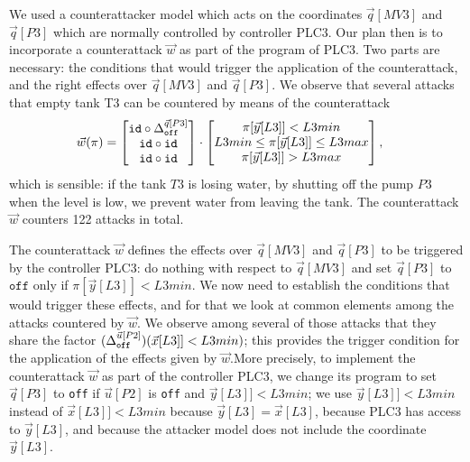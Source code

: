 {{We used a counterattacker model which acts on the coordinates $\vec{q}[MV3]$ and $\vec{q}[P3]$ which are normally controlled by controller PLC3. Our plan then is to incorporate a counterattack $\vec{w}$ as part of the program of PLC3. Two parts are necessary: the conditions that would trigger the application of the counterattack, and the right effects over $\vec{q}[MV3]$ and $\vec{q}[P3]$. We observe that several attacks that empty tank T3 can be countered by means of the counterattack 
\begin{align*}
    \vec{w}(\pi)&=
    \begin{bmatrix}
    {\texttt{id}}\circ {\Delta}^{\vec{q}[P3]}_{\texttt{off}} \\
     {\texttt{id}}\circ {\texttt{id}} \\
     {\texttt{id}}\circ {\texttt{id}} \\
    \end{bmatrix}
    \cdot
    \begin{bmatrix}
      \pi[\vec{y}[L3]]<L3min \\
      L3min \leq \pi[\vec{y}[L3]]\leq L3max \\
      \pi[\vec{y}[L3]]>L3max
    \end{bmatrix},
  \end{align*} 
which is sensible: if the tank $T3$ is losing water, by shutting off the pump $P3$ when the level is low, we prevent water from leaving the tank. The counterattack $\vec{w}$ counters 122 attacks in total.

The counterattack $\vec{w}$ defines the effects over $\vec{q}[MV3]$ and $\vec{q}[P3]$ to be triggered by the controller PLC3: do nothing with respect to $\vec{q}[MV3]$ and set $\vec{q}[P3]$ to $\texttt{off}$ only if $\pi[\vec{y}[L3]]<L3min$. We now need to establish the conditions that would trigger these effects, and for that we look at common elements among the attacks countered by $\vec{w}$. We observe among several of those attacks that they share the factor $({\Delta}^{\vec{u}[P2]}_{\texttt{off}})(\vec{x}[L3]]<L3min)$; this provides the trigger condition for the application of the effects given by $\vec{w}$.More precisely, to implement the counterattack $\vec{w}$ as part of the controller PLC3, we change its program to set $\vec{q}[P3]$ to \texttt{off} if $\vec{u}[P2]$ is \texttt{off} and $\vec{y}[L3]]<L3min$; we use $\vec{y}[L3]]<L3min$ instead of $\vec{x}[L3]]<L3min$ because $\vec{y}[L3]=\vec{x}[L3]$, because PLC3 has access to $\vec{y}[L3]$, and because the attacker model does not include the coordinate $\vec{y}[L3]$. 

}}
